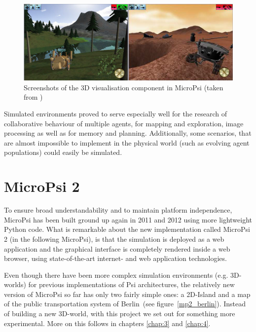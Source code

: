 \begin{figure}[h]
  \centering
    \includegraphics[width=14cm]{graphics/micropsi_3d_screen}
  \caption[Screenshots of the 3D visualisation component in MicroPsi]{Screenshots of the 3D visualisation component in MicroPsi (taken from \cite{Bach:2009:PSI:1611304})}
  \label{micropsi_3d_screen}
\end{figure}

Simulated environments proved to serve especially well for the research of collaborative behaviour of multiple agents, for mapping and exploration, image processing as well as for memory and planning. Additionally, some scenarios, that are almost impossible to implement in the physical world (such as evolving agent populations) could easily be simulated.~\cite{Bach:2009:PSI:1611304}

    \section{MicroPsi 2}
    \label{sec:2:MicroPsi}
To ensure broad understandability and to maintain platform independence, MicroPsi has been built ground up again in 2011 and 2012 using more lightweight Python code. What is remarkable about the new implementation called MicroPsi 2 (in the following MicroPsi), is that the simulation is deployed as a web application and the graphical interface is completely rendered inside a web browser, using state-of-the-art internet- and web application technologies.~\cite{conf/agi/Bach12}
        
Even though there have been more complex simulation environments (e.g. 3D-worlds) for previous implementations of Psi architectures, the relatively new version of MicroPsi so far has only two fairly simple ones: a 2D-Island and a map of the public transportation system of Berlin~(see figure~\ref{mp2_berlin}). Instead of building a new 3D-world, with this project we set out for something more experimental. More on this follows in chapters \ref{chap:3} and \ref{chap:4}.

